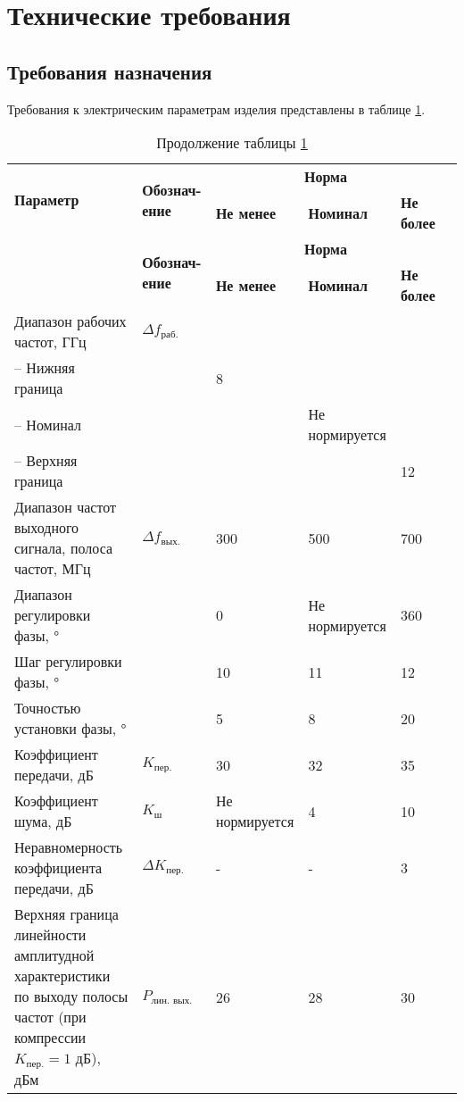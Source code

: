 \section{Технические требования}

\subsection{Требования назначения}

Требования к электрическим параметрам изделия представлены в таблице \ref{tab:teh-treb-ez}.




\begin{longtable}{|p{4cm}|p{2cm}|p{2cm}|p{2cm}|p{2cm}|p{2cm}|}
\caption{Требования к электрическим параметрам изделия}\label{tab:teh-treb-ez}
\hline
\multirow{2}{4cm}{\textbf{Параметр}}                   & \multirow{2}{2cm}{\textbf{Обознач-ение}}    & \multicolumn{3}{c|}{\textbf{Норма}} & \multirow{2}{2cm}{\multicolumn{1}{c}{\textbf{Примечание}}} \\ \cline{3-5}
& & \textbf{Не менее} & \textbf{Номинал} & \textbf{Не более} & \\ \hline 
\endfirsthead    %
\caption*{Продолжение таблицы \ref{tab:teh-treb-ez}}%
\hline
\multirow{2}{4cm}{\textbf{Параметр}}                   & \multirow{2}{2cm}{\textbf{Обознач-ение}}    & \multicolumn{3}{c|}{\textbf{Норма}} & \multirow{2}{2cm}{\multicolumn{1}{c}{\textbf{Примечание}}} \\ \cline{3-5}
& & \textbf{Не менее} & \textbf{Номинал} & \textbf{Не более} & \\ \hline 
\endhead %
Диапазон рабочих частот, ГГц & $\Delta f_\text{раб.}$ &  & & & \\ 
-- Нижняя граница & & 8 & & & \\ 
-- Номинал & & & Не нормируется & & \\ 
-- Верхняя граница & & & & 12 & \\ \hline 
Диапазон частот выходного сигнала, полоса частот, МГц & $\Delta f_\text{вых.}$ & 300 & 500 & 700 & \\ \hline
Диапазон регулировки фазы, ° &  & 0 & Не нормируется & 360 & \\
Шаг регулировки фазы, ° &  & 10 & 11 & 12 & \\
Точностью установки фазы, ° &  & 5 & 8 & 20 & \\ \hline
Коэффициент передачи, дБ & $K_\text{пер.}$ & 30 & 32 & 35 & \\ \hline
Коэффициент шума, дБ & $K_\text{ш}$ & Не нормируется & 4 & 10 & \\ \hline
Неравномерность коэффициента передачи, дБ & $\Delta K_\text{пер.}$ & - & - & 3 & \\ \hline
Верхняя граница линейности амплитудной характеристики по выходу полосы частот (при компрессии $K_\text{пер.} = 1$ дБ), дБм & $P_\text{лин. вых.}$ & 26 & 28 & 30 &  \\ \hline


\end{longtable}
